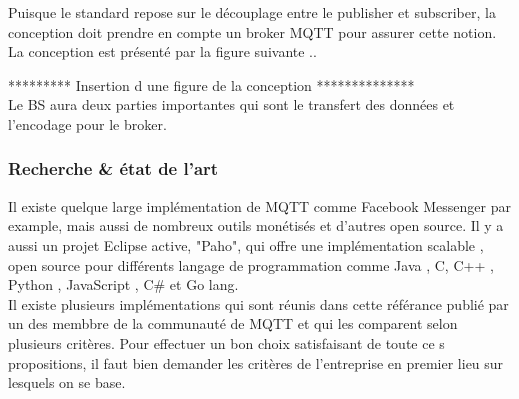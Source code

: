         Puisque le standard repose sur le découplage entre le publisher et subscriber, la conception doit prendre 
        en compte  un broker MQTT pour assurer cette notion. 
        La conception est présenté par la figure suivante .. 

 ********* Insertion d une figure de la conception ************** \\
        Le BS aura deux parties importantes qui sont le transfert des données et l'encodage pour le broker.

    \subsubsection{Recherche \& état de l'art}
            

        Il existe quelque large implémentation de MQTT comme Facebook Messenger par example, mais aussi de nombreux 
        outils monétisés et d'autres open source.
        Il y a aussi un projet Eclipse active, "Paho", qui offre une implémentation scalable , open source pour 
        différents langage de programmation comme Java , 
        C, C++ , Python , JavaScript , C\# et Go lang. \\
        Il existe plusieurs implémentations qui sont réunis dans cette référance \cite{mqtt_choix} publié par un des membbre de la communauté de MQTT et qui les comparent selon plusieurs critères. 
        Pour effectuer un bon choix satisfaisant de toute ce    s propositions, il faut bien demander les critères de l'entreprise en premier lieu 
        sur lesquels on se base. \\
        
